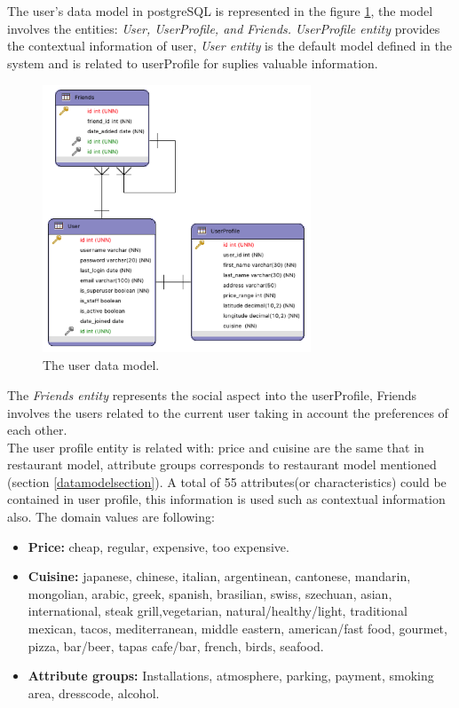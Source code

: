 The user's data model in postgreSQL is represented in the figure
\ref{fig:datausermodel}, the model involves the entities:
\textit{User, UserProfile, and Friends.} \textit{UserProfile entity}
provides the contextual information of user, \textit{User entity} is
the default model defined in the system and is related to userProfile
for suplies valuable information. 
\begin{figure}
\captionsetup{font=footnotesize}
\centering
\includegraphics[width=8cm,height=8cm,keepaspectratio]
{img/data-usermodel.png}
\caption{The user data model.}
\label{fig:datausermodel}     
\end{figure}
The \textit{Friends entity}
represents the social aspect into the userProfile, Friends involves
the users related to the current user taking in account the
preferences of each other. \\The user profile entity is related with: 
price and cuisine are the same that in restaurant model,
attribute groups corresponds to restaurant model mentioned (section
\ref{datamodelsection}). A total of 55 attributes(or characteristics) 
could be contained in user profile, this information is used such as 
contextual information also. The domain values are following:
\begin{itemize}
\item \textbf{Price:} cheap, regular, expensive, too expensive.
\item \textbf{Cuisine:} japanese, chinese, italian, argentinean,
cantonese, mandarin, mongolian, arabic, greek, spanish, brasilian,
swiss, szechuan, asian, international, steak grill,vegetarian,
natural/healthy/light, traditional mexican, tacos, mediterranean,
middle eastern, american/fast food, gourmet, pizza, bar/beer, tapas
cafe/bar, french, birds, seafood.
\item  \textbf{Attribute groups:} Installations, atmosphere, 
parking, payment, smoking area, dresscode, alcohol.
\end{itemize}


